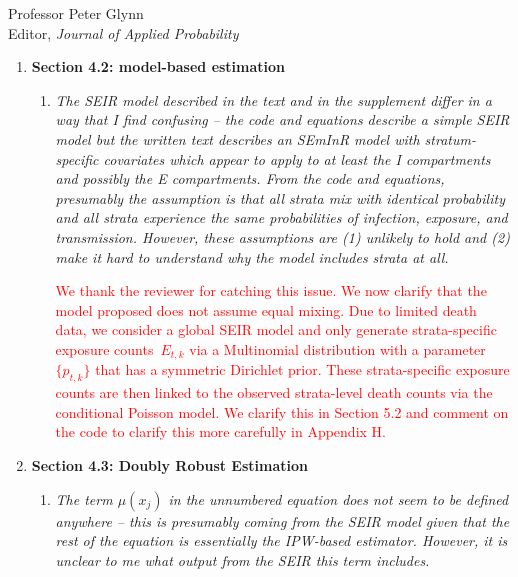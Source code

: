 \documentclass[11pt]{letter} %
\begin{document}
\begin{letter}{Professor
	Peter Glynn\\
	Editor, {\em Journal of Applied Probability}}
\begin{enumerate}
\begin{enumerate}
	Section 4.1.3 allows researchers to choose to go beyond simpler moving window averages (i.e., daily/weekly averages).  The kernel function allows the user to choose weighted averages that may be more robust than the uniform kernel (which is equivalent to the a moving average over some fixed window of time).  The proposed approach helps smooth the estimated propensity over time; moreover, the flexibility of the approach for government agencies who may observed random samples at different frequencies is of practical importance.
	\vspace{5mm}
\end{enumerate}
\item {\bf Section 4.2: model-based estimation}
\begin{enumerate}
	\item {\it The SEIR model described in the text and in the supplement differ in a way that I find confusing – the code and equations describe a simple SEIR model but the written text describes an SEmInR model with stratum-specific covariates which appear to apply to at least the I compartments and possibly the E compartments. From the code and equations, presumably the assumption is that all strata mix with identical probability and all strata experience the same probabilities of infection, exposure, and transmission. However, these assumptions are (1) unlikely to hold and (2) make it hard to understand why the model includes strata at all. }
	\vspace{5mm}

	\textcolor{red}{
	We thank the reviewer for catching this issue.  We now clarify that the model proposed does not assume equal mixing.  Due to limited death data, we consider a global SEIR model and only generate strata-specific exposure counts~$E_{t,k}$ via a Multinomial distribution with a parameter~$\{ p_{t,k}  \} $ that has a symmetric Dirichlet prior.  These strata-specific exposure counts are then linked to the observed strata-level death counts via the conditional Poisson model.  We clarify this in Section 5.2 and comment on the code to clarify this more carefully in Appendix H.
	}
	\vspace{5mm}
\end{enumerate}
\item {\bf Section 4.3: Doubly Robust Estimation}
\begin{enumerate}
	\item {\it The term $\mu(x_j)$ in the unnumbered equation does not seem to be defined anywhere – this is presumably coming from the SEIR model given that the rest of the equation is essentially the IPW-based estimator. However, it is unclear to me what output from the SEIR this term includes.}
	\vspace{5mm}


\end{enumerate}
\end{enumerate}
\end{letter}
\end{document}
